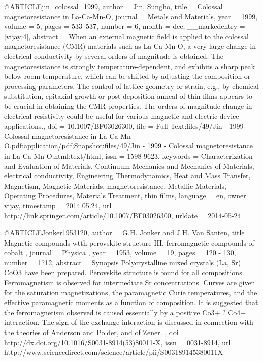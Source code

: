 @ARTICLE{jin_colossal_1999,
  author = {Jin, Sungho},
  title = {Colossal magnetoresistance in La-Ca-Mn-O},
  journal = {Metals and Materials},
  year = {1999},
  volume = {5},
  pages = {533--537},
  number = {6},
  month = dec,
  __markedentry = {[vijay:4]},
  abstract = {When an external magnetic field is applied to the colossal magnetoresistance
	({CMR)} materials such as La-Ca-Mn-O, a very large change in electrical
	conductivity by several orders of magnitude is obtained. The magnetoresistance
	is strongly temperature-dependent, and exhibits a sharp peak below
	room temperature, which can be shifted by adjusting the composition
	or processing parameters. The control of lattice geometry or strain,
	e.g., by chemical substitution, epitaxial growth or post-deposition
	anneal of thin films appears to be crucial in obtaining the {CMR}
	properties. The orders of magnitude change in electrical resistivity
	could be useful for various magnetic and electric device applications.},
  doi = {10.1007/BF03026300},
  file = {Full Text:files/49/Jin - 1999 - Colossal magnetoresistance in La-Ca-Mn-O.pdf:application/pdf;Snapshot:files/49/Jin - 1999 - Colossal magnetoresistance in La-Ca-Mn-O.html:text/html},
  issn = {1598-9623},
  keywords = {Characterization and Evaluation of Materials, Continuum Mechanics
	and Mechanics of Materials, electrical conductivity, Engineering
	Thermodynamics, Heat and Mass Transfer, Magnetism, Magnetic Materials,
	magnetoresistance, Metallic Materials, Operating Procedures, Materials
	Treatment, thin films},
  language = {en},
  owner = {vijay},
  timestamp = {2014.05.24},
  url = {http://link.springer.com/article/10.1007/BF03026300},
  urldate = {2014-05-24}
}

@ARTICLE{Jonker1953120,
  author = {G.H. Jonker and J.H. Van Santen},
  title = {Magnetic compounds wtth perovskite structure III. ferromagnetic compounds
	of cobalt },
  journal = {Physica },
  year = {1953},
  volume = {19},
  pages = {120 - 130},
  number = {1?12},
  abstract = {Synopsis Polycrystalline mixed crystals (La, Sr) CoO3 have been prepared.
	Perovskite structure is found for all compositions. Ferromagnetism
	is observed for intermediate Sr concentrations. Curves are given
	for the saturation magnetizations, the paramagnetic Curie temperatures,
	and the effective paramagnetic moments as a function of composition.
	It is suggested that the ferromagnetism observed is caused essentially
	by a positive Co3+ ? Co4+ interaction. The sign of the exchange interaction
	is discussed in connection with the theories of Anderson and Polder,
	and of Zener. },
  doi = {http://dx.doi.org/10.1016/S0031-8914(53)80011-X},
  issn = {0031-8914},
  url = {http://www.sciencedirect.com/science/article/pii/S003189145380011X}
}

